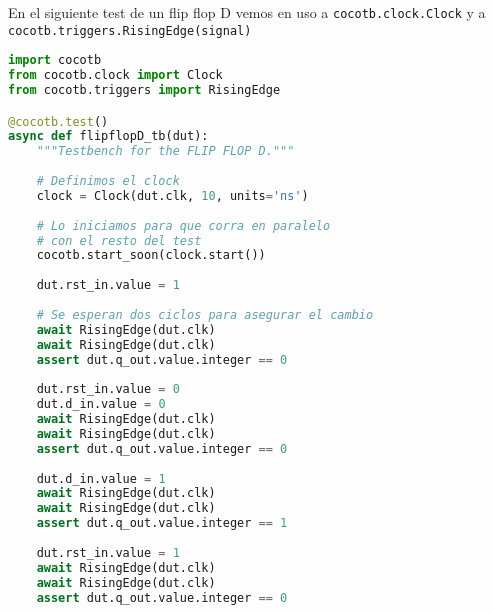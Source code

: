 \documentclass[a4paper,12pt]{article}
\begin{document}
En el siguiente test de un flip flop D vemos en uso a \texttt{cocotb.clock.Clock} y a \texttt{cocotb.triggers.RisingEdge(signal)}
\begin{lstlisting}[language=Python, caption=flipflopd\_tb.py, frame=lines]
import cocotb
from cocotb.clock import Clock
from cocotb.triggers import RisingEdge

@cocotb.test()
async def flipflopD_tb(dut):
	"""Testbench for the FLIP FLOP D."""
	
	# Definimos el clock
	clock = Clock(dut.clk, 10, units='ns')
	
	# Lo iniciamos para que corra en paralelo 
	# con el resto del test
	cocotb.start_soon(clock.start())
	
	dut.rst_in.value = 1
	
	# Se esperan dos ciclos para asegurar el cambio
	await RisingEdge(dut.clk)
	await RisingEdge(dut.clk) 
	assert dut.q_out.value.integer == 0
	
	dut.rst_in.value = 0
	dut.d_in.value = 0
	await RisingEdge(dut.clk)
	await RisingEdge(dut.clk)
	assert dut.q_out.value.integer == 0
	
	dut.d_in.value = 1
	await RisingEdge(dut.clk)
	await RisingEdge(dut.clk)
	assert dut.q_out.value.integer == 1
	
	dut.rst_in.value = 1
	await RisingEdge(dut.clk)
	await RisingEdge(dut.clk)
	assert dut.q_out.value.integer == 0
\end{lstlisting}


\listoftodos
\end{document}
